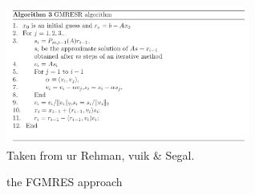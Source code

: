 




 









\begin{center}
\includegraphics[width=8cm]{images/solvers/GMRESR}\\
{\captionfont Taken from ur Rehman, vuik \& Segal.}
\end{center}

the FGMRES approach \cite{deit13}

\Literature \cite{pasa75,mamo08,fumt11,knke04,kool00,kopo93,rusg17} 

